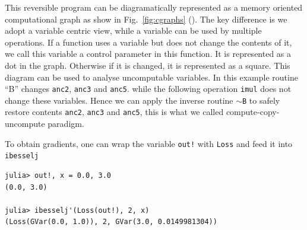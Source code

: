 \documentclass[aps,twocolumn,longbibliography,english,superscriptaddress]{revtex4-1}
\newcommand{\<}{\langle}
\renewcommand{\>}{\rangle}
\newcommand{\Fig}[1]{Fig.~\ref{#1}}
\theoremstyle{definition}\newtheorem{definition}{\textit{Definition}}
\begin{document}
This reversible program can be diagramatically represented as a memory oriented computational graph as show in \Fig{fig:cgraphs} ().
The key difference is we adopt a variable centric view, while a variable can be used by multiple operations.
If a function uses a variable but does not change the contents of it, we call this variable a control parameter in this function. It is represented as a dot in the graph. Otherwise if it is changed, it is represented as a square.
This diagram can be used to analyse uncomputable variables. In this example routine ``B'' changes \texttt{anc2}, \texttt{anc3} and \texttt{anc5}.
while the following operation \texttt{imul} does not change these variables.
Hence we can apply the inverse routine \texttt{$\sim$B} to safely restore contents \texttt{anc2}, \texttt{anc3} and \texttt{anc5}, this is what we called compute-copy-uncompute paradigm.


To obtain gradients, one can wrap the variable \texttt{out!} with \texttt{Loss} and feed it into \texttt{ibesselj\textquotesingle}

\begin{minipage}{.44\textwidth}
\begin{lstlisting}
julia> out!, x = 0.0, 3.0
(0.0, 3.0)

julia> ibesselj'(Loss(out!), 2, x)
(Loss(GVar(0.0, 1.0)), 2, GVar(3.0, 0.0149981304))
\end{lstlisting}
\end{minipage}
\end{document}
